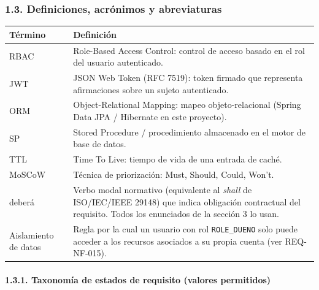 \documentclass[
  spanish,
]{article}
\newcounter{none} %
\begin{document}
\subsubsection{1.3. Definiciones, acrónimos y
abreviaturas}\label{definiciones-acruxf3nimos-y-abreviaturas}

{\def\LTcaptype{none} %
\begin{longtable}[]{@{}
  >{\raggedright\arraybackslash}p{}
  >{\raggedright\arraybackslash}p{}@{}}
\toprule\noalign{}
\begin{minipage}[b]{\linewidth}\raggedright
Término
\end{minipage} & \begin{minipage}[b]{\linewidth}\raggedright
Definición
\end{minipage} \\
\midrule\noalign{}
\endhead
\bottomrule\noalign{}
\endlastfoot
RBAC & Role-Based Access Control: control de acceso basado en el rol del
usuario autenticado. \\
JWT & JSON Web Token (RFC 7519): token firmado que representa
afirmaciones sobre un sujeto autenticado. \\
ORM & Object-Relational Mapping: mapeo objeto-relacional (Spring Data
JPA / Hibernate en este proyecto). \\
SP & Stored Procedure / procedimiento almacenado en el motor de base de
datos. \\
TTL & Time To Live: tiempo de vida de una entrada de caché. \\
MoSCoW & Técnica de priorización: Must, Should, Could, Won't. \\
deberá & Verbo modal normativo (equivalente al \emph{shall} de
ISO/IEC/IEEE 29148) que indica obligación contractual del requisito.
Todos los enunciados de la sección 3 lo usan. \\
Aislamiento de datos & Regla por la cual un usuario con rol
\texttt{ROLE\_\allowbreak{}DUENO} solo puede acceder a los recursos asociados a su
propia cuenta (ver REQ-NF-015). \\
\end{longtable}
}

\paragraph{1.3.1. Taxonomía de estados de requisito (valores
permitidos)}\label{taxonomuxeda-de-estados-de-requisito-valores-permitidos}
\end{document}
